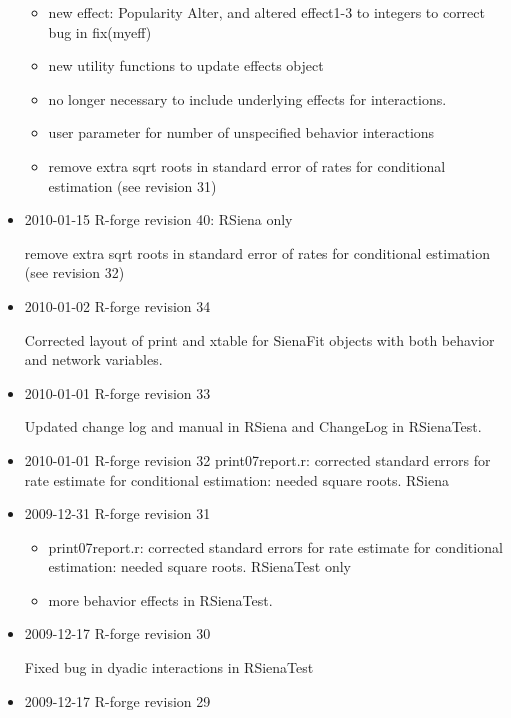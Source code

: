 \documentclass[a4paper,fleqn,11pt]{article}
\newcommand{\+}{\, + \,}
\newcommand{\sfn}[1]{\textsf{#1}}
\begin{document}
\begin{small}
\begin{itemize}
\begin{itemize}
\item
   new effect: Popularity Alter, and altered effect1-3 to integers to correct
  bug in fix(myeff)
  \item new utility functions to update effects object
  \item no longer
  necessary to include underlying effects for interactions.
  \item user parameter for number of unspecified behavior interactions
  \item  remove extra sqrt roots in standard error of rates for conditional
  estimation (see revision 31)
\end{itemize}
\item 2010-01-15 R-forge revision 40: RSiena only

  remove extra sqrt roots in standard error of rates for conditional
  estimation (see revision 32)


\item 2010-01-02 R-forge revision 34

  Corrected layout of \sfn{print} and \sfn{xtable} for \sfn{SienaFit} objects
  with both behavior and network variables.

\item 2010-01-01 R-forge revision 33

Updated change log and manual in RSiena and \sfn{ChangeLog} in RSienaTest.

\item 2010-01-01 R-forge revision 32
    print07report.r: corrected standard errors for rate estimate for
    conditional estimation: needed square roots. RSiena

\item 2009-12-31 R-forge revision 31
\begin{itemize}
\item
    print07report.r: corrected standard errors for rate estimate for
    conditional estimation: needed square roots. RSienaTest only

\item more behavior effects in RSienaTest.
\end{itemize}

\item 2009-12-17 R-forge revision 30

Fixed bug in dyadic interactions in RSienaTest

\item 2009-12-17 R-forge revision 29


\end{itemize}
\end{small}
\end{document}
